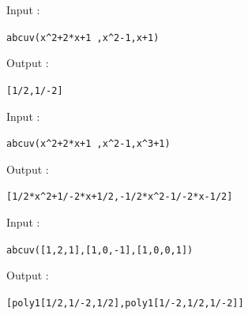 \documentclass[a4paper,11pt]{book}
\begin{document}
Input :
\begin{center}{\tt abcuv(x\verb|^|2+2*x+1 ,x\verb|^|2-1,x+1)}\end{center}
Output :
\begin{center}{\tt [1/2,1/-2]}\end{center}
Input :
\begin{center}{\tt abcuv(x\verb|^|2+2*x+1 ,x\verb|^|2-1,x\verb|^|3+1)}\end{center}
Output :
\begin{center}{\tt [1/2*x\verb|^|2+1/-2*x+1/2,-1/2*x\verb|^|2-1/-2*x-1/2]}\end{center}
Input :
\begin{center}{\tt abcuv([1,2,1],[1,0,-1],[1,0,0,1])}\end{center}
Output :
\begin{center}{\tt [poly1[1/2,1/-2,1/2],poly1[1/-2,1/2,1/-2]]}\end{center}

% 
\end{document}
